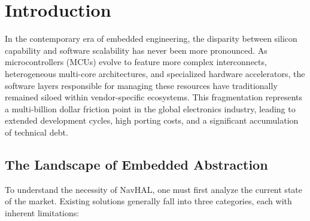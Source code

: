 \section{Introduction}
\label{sec:introduction}

In the contemporary era of embedded engineering, the disparity between silicon capability and software scalability has never been more pronounced. As microcontrollers (MCUs) evolve to feature more complex interconnects, heterogeneous multi-core architectures, and specialized hardware accelerators, the software layers responsible for managing these resources have traditionally remained siloed within vendor-specific ecosystems. This fragmentation represents a multi-billion dollar friction point in the global electronics industry, leading to extended development cycles, high porting costs, and a significant accumulation of technical debt.

\subsection{The Landscape of Embedded Abstraction}
To understand the necessity of NavHAL, one must first analyze the current state of the market. Existing solutions generally fall into three categories, each with inherent limitations:

